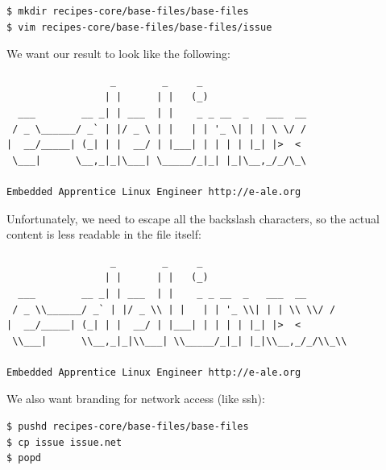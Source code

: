 \documentclass[a4paper,12pt,obeyspaces,spaces,hyphens]{article}
\begin{document}
\begin{verbatim}
$ mkdir recipes-core/base-files/base-files
$ vim recipes-core/base-files/base-files/issue
\end{verbatim}

We want our result to look like the following:

\begin{tcolorbox}[enhanced jigsaw,colback=bg,boxrule=0pt,arc=0pt]
\begin{verbatim}
                  _        _     _
                 | |      | |   (_)
  ___        __ _| | ___  | |    _ _ __  _   ___  __
 / _ \______/ _` | |/ _ \ | |   | | '_ \| | | \ \/ /
|  __/_____| (_| | |  __/ | |___| | | | | |_| |>  <
 \___|      \__,_|_|\___| \_____/_|_| |_|\__,_/_/\_\

Embedded Apprentice Linux Engineer http://e-ale.org
\end{verbatim}
\end{tcolorbox}

Unfortunately, we need to escape all the backslash characters, so the actual content is less readable in the file itself:

\begin{tcolorbox}[enhanced jigsaw,colback=bg,boxrule=0pt,arc=0pt]
\begin{verbatim}
                  _        _     _
                 | |      | |   (_)
  ___        __ _| | ___  | |    _ _ __  _   ___  __
 / _ \\______/ _` | |/ _ \\ | |   | | '_ \\| | | \\ \\/ /
|  __/_____| (_| | |  __/ | |___| | | | | |_| |>  <
 \\___|      \\__,_|_|\\___| \\_____/_|_| |_|\\__,_/_/\\_\\

Embedded Apprentice Linux Engineer http://e-ale.org
\end{verbatim}
\end{tcolorbox}

We also want branding for network access (like ssh):
\begin{verbatim}
$ pushd recipes-core/base-files/base-files
$ cp issue issue.net
$ popd
\end{verbatim}
\end{document}
